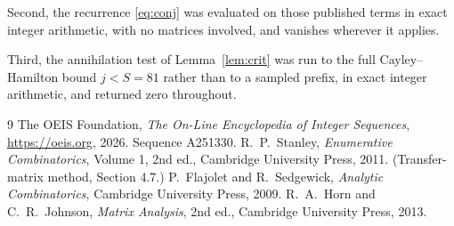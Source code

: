 \documentclass[11pt,a4paper]{article}
\theoremstyle{plain}
\theoremstyle{definition}
\begin{document}
Second, the recurrence \eqref{eq:conj} was evaluated on those published terms in exact
integer arithmetic, with no matrices involved, and vanishes wherever it applies.

Third, the annihilation test of Lemma~\ref{lem:crit} was run to the full Cayley--Hamilton
bound $j<S=81$ rather than to a sampled prefix, in exact integer arithmetic, and returned
zero throughout.

\begin{thebibliography}{9}
 The OEIS Foundation, \emph{The On-Line Encyclopedia of Integer
Sequences}, \url{https://oeis.org}, 2026. Sequence A251330.
 R.~P.~Stanley, \emph{Enumerative Combinatorics}, Volume 1, 2nd ed.,
Cambridge University Press, 2011. (Transfer-matrix method, Section 4.7.)
 P.~Flajolet and R.~Sedgewick, \emph{Analytic Combinatorics}, Cambridge
University Press, 2009.
 R.~A.~Horn and C.~R.~Johnson, \emph{Matrix Analysis}, 2nd ed., Cambridge
University Press, 2013.
\end{thebibliography}
\end{document}

